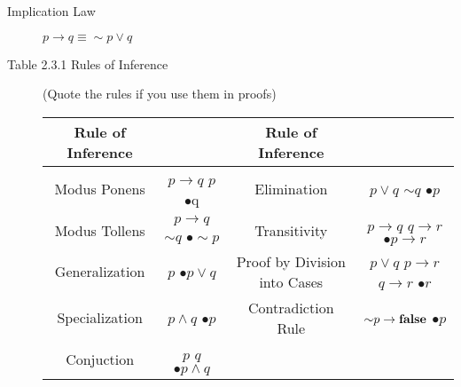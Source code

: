\documentclass{article}
\begin{document}
\begin{description}
\begin{table}[h]
{\begin{tabular}{|c|c|c|c|}
            \hline
        \end{tabular}}
        \label{tab:1}
    \end{table}
    \item[Implication Law]$p\to q\equiv {\sim} p\vee q $ 
    \item[Table 2.3.1 Rules of Inference] (Quote the rules if you use them in proofs)
    \begin{table}[h]
    	\centering
		{
		\begin{tabular}{|c|c|c|c|} 
			\hline
			Rule of Inference & & Rule of Inference & \\
			\hline
			Modus Ponens & $p\to q$ \quad $p$ \quad $\bullet$q & Elimination & $p\lor q$ \quad ${\sim} q$ \quad $\bullet p$ \\
			Modus Tollens & $p\to q$ \quad ${\sim} q$ \quad $\bullet{\sim} p$ & Transitivity & $p\to q$ \quad $q\to r$ \quad $\bullet p\to r$ \\
			Generalization &  $p$ \quad $\bullet p\lor q$ & Proof by Division into Cases  & $p\lor q$ \quad $p\to r$ \quad $q\to r$ \quad $\bullet r$ \\
			Specialization &  $p\land q$ \quad $\bullet p$ & Contradiction Rule & ${\sim}{p}\to\text{\textbf{false}}$ \quad $\bullet p$ \\
			Conjuction & $p$ \quad $q$ \quad $\bullet p\land q$ & \ & \\
			\hline
		\end{tabular}}
		\label{tab:2}
    \end{table}
    

\end{description}
\end{document}
